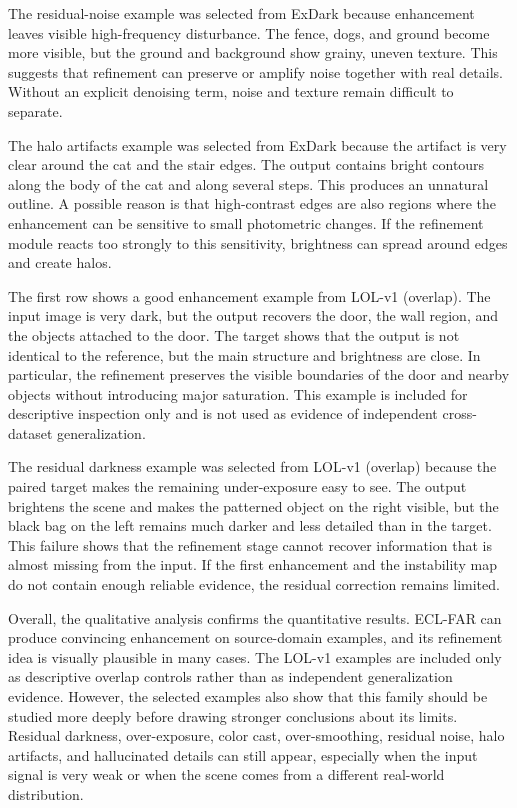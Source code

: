 The residual-noise example was selected from ExDark because enhancement leaves visible high-frequency disturbance. The fence, dogs, and ground become more visible, but the ground and background show grainy, uneven texture. This suggests that refinement can preserve or amplify noise together with real details. Without an explicit denoising term, noise and texture remain difficult to separate.

The halo artifacts example was selected from ExDark because the artifact is very clear around the cat and the stair edges. The output contains bright contours along the body of the cat and along several steps. This produces an unnatural outline. A possible reason is that high-contrast edges are also regions where the enhancement can be sensitive to small photometric changes. If the refinement module reacts too strongly to this sensitivity, brightness can spread around edges and create halos.

The first row shows a good enhancement example from LOL-v1 (overlap). The input image is very dark, but the output recovers the door, the wall region, and the objects attached to the door. The target shows that the output is not identical to the reference, but the main structure and brightness are close. In particular, the refinement preserves the visible boundaries of the door and nearby objects without introducing major saturation. This example is included for descriptive inspection only and is not used as evidence of independent cross-dataset generalization.

The residual darkness example was selected from LOL-v1 (overlap) because the paired target makes the remaining under-exposure easy to see. The output brightens the scene and makes the patterned object on the right visible, but the black bag on the left remains much darker and less detailed than in the target. This failure shows that the refinement stage cannot recover information that is almost missing from the input. If the first enhancement and the instability map do not contain enough reliable evidence, the residual correction remains limited.

Overall, the qualitative analysis confirms the quantitative results. ECL-FAR can produce convincing enhancement on source-domain examples, and its refinement idea is visually plausible in many cases. The LOL-v1 examples are included only as descriptive overlap controls rather than as independent generalization evidence. However, the selected examples also show that this family should be studied more deeply before drawing stronger conclusions about its limits. Residual darkness, over-exposure, color cast, over-smoothing, residual noise, halo artifacts, and hallucinated details can still appear, especially when the input signal is very weak or when the scene comes from a different real-world distribution.

